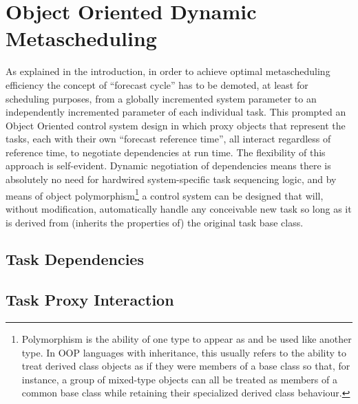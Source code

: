 \documentclass[11pt,a4paper]{article}
\begin{document}
\section{Object Oriented Dynamic Metascheduling}

As explained in the introduction, in order to achieve optimal
metascheduling efficiency the concept of ``forecast cycle'' has to be
demoted, at least for scheduling purposes, from a globally incremented
system parameter to an independently incremented parameter of each
individual task. This prompted an Object Oriented control system design
in which proxy objects that represent the tasks, each with their own
``forecast reference time'', all interact regardless of reference time,
to negotiate dependencies at run time. The flexibility of this approach
is self-evident. Dynamic negotiation of dependencies means there is
absolutely no need for hardwired system-specific task sequencing logic,
and by means of object polymorphism\footnote{Polymorphism is the ability
of one type to appear as and be used like another type. In OOP languages
with inheritance, this usually refers to the ability to treat derived
class objects as if they were members of a base class so that, for
instance, a group of mixed-type objects can all be treated as members of
a common base class while retaining their specialized derived class
behaviour.} a control system can be designed that will, without
modification, automatically handle any conceivable new task so long as
it is derived from (inherits the properties of) the original task base
class. 

\subsection{Task Dependencies}

\subsection{Task Proxy Interaction}
\end{document}
